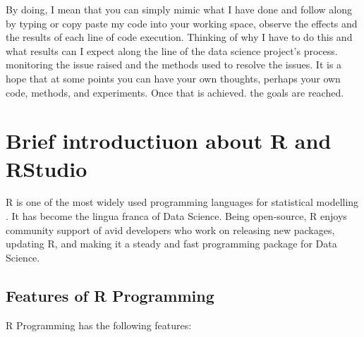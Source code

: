 \documentclass[
]{book}
\begin{document}
By doing, I mean that you can simply mimic what I have done and follow along by typing or copy paste my code into your working space, observe the effects and the results of each line of code execution. Thinking of why I have to do this and what results can I expect along the line of the data science project's process. monitoring the issue raised and the methods used to resolve the issues. It is a hope that at some points you can have your own thoughts, perhaps your own code, methods, and experiments. Once that is achieved. the goals are reached.

\hypertarget{brief-introductiuon-about-r-and-rstudio}{%
\section{Brief introductiuon about R and RStudio}\label{brief-introductiuon-about-r-and-rstudio}}

R is one of the most widely used programming languages for statistical modelling \citep{Dalpiaz2021}. It has become the lingua franca of Data Science. Being open-source, R enjoys community support of avid developers who work on releasing new packages, updating R, and making it a steady and fast programming package for Data Science\citep{Wickham2021}.

\hypertarget{features-of-r-programming}{%
\subsection*{Features of R Programming}\label{features-of-r-programming}}


R Programming has the following features:
\end{document}

